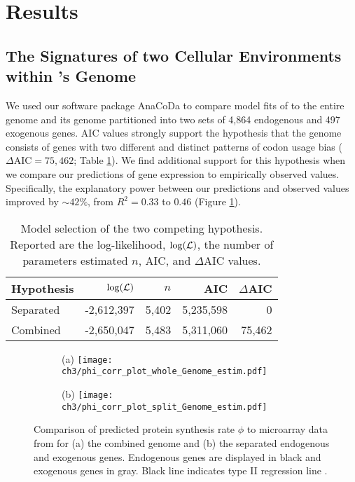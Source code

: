 \section{Results}
\subsection{The Signatures of two Cellular Environments within \kluyveri's Genome}
We used our software package AnaCoDa \citep{landerer2018} to compare model fits of \ROC to the entire \kluyveri genome and its genome partitioned into two sets of 4,864 endogenous and 497 exogenous genes.
AIC values strongly support the hypothesis that the \kluyveri genome consists of genes with two different and distinct patterns of codon usage bias ($\Delta\text{AIC} = 75,462$; Table \ref{tab:AIC_klu}).
We find additional support for this hypothesis when we compare our predictions of gene expression to empirically observed values.
Specifically, the explanatory power between our predictions and observed values improved by $\sim 42\%$, from $R^2 = 0.33$ to $0.46$ (Figure \ref{fig:phi_corr_two_cond}).

\begin{table}
  \centering
  \caption{Model selection of the two competing hypothesis. 
  Reported are the log-likelihood, $\log(\mathcal{L})$, the number of parameters estimated $n$, AIC, and $\Delta$AIC values.}
  \begin{tabular}{lrrrr}
    \hline
    Hypothesis             & $\log(\mathcal{L})$ &$n$ &  AIC & $\Delta$AIC\\ \hline 
    Separated		   & -2,612,397 & 5,402 & 5,235,598&      0\\
    Combined               & -2,650,047 & 5,483 & 5,311,060& 75,462\\ \hline
  \end{tabular}
  \label{tab:AIC_klu}
\end{table}

\begin{figure}
    \centering
    \begin{subfigure}
        \centering
        (a) \texttt{[image: ch3/phi\_corr\_plot\_whole\_Genome\_estim.pdf]}
    \end{subfigure}
    \begin{subfigure}
        \centering
        (b) \texttt{[image: ch3/phi\_corr\_plot\_split\_Genome\_estim.pdf]}
    \end{subfigure}
    \caption{Comparison of predicted protein synthesis rate $\phi$ to microarray data from \citet{tsankov2010} for (a) the combined genome and (b) the separated endogenous and exogenous genes. 
    Endogenous genes are displayed in black and exogenous genes in gray. Black line indicates type II regression line \citep{SokalAndRohlf1981}.}
    \label{fig:phi_corr_two_cond}
\end{figure}


